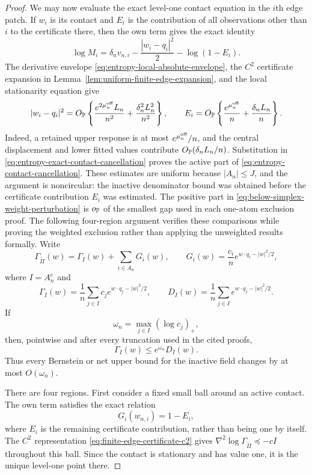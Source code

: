 \begin{proof}
We may now evaluate the exact level-one contact equation in the \(i\)th
edge patch.  If \(w_i\) is its contact and \(E_i\) is the contribution of
all observations other than \(i\) to the certificate there, then the own
term gives the exact identity
\begin{equation}
\label{eq:entropy-exact-contact-cancellation}
 \log M_i
 =
 \delta_nv_{n,i}-\frac{|w_i-q_i|^2}{2}-\log(1-E_i).
\end{equation}
The derivative envelope
\eqref{eq:entropy-local-absolute-envelope}, the \(C^2\) certificate
expansion in Lemma~\ref{lem:uniform-finite-edge-expansion}, and the local
stationarity equation give
\[
 |w_i-q_i|^2
 =O_{\mathbb P}\left\{
  \frac{e^{2\mu_n^{\rm off}}L_n}{n^2}
  +\frac{\delta_n^2L_n^2}{n^2}
 \right\},
 \qquad
 E_i
 =O_{\mathbb P}\left\{
  \frac{e^{\mu_n^{\rm off}}}n+\frac{\delta_nL_n}{n}
 \right\}.
\]
Indeed, a retained upper response is at most
\(e^{\mu_n^{\rm off}}/n\), and the
central displacement and lower fitted values contribute
\(O_{\mathbb P}(\delta_nL_n/n)\).  Substitution in
\eqref{eq:entropy-exact-contact-cancellation} proves the active part of
\eqref{eq:entropy-contact-cancellation}.  These estimates are uniform
because \(|A_n|\le J\), and the argument is noncircular: the inactive
denominator bound was obtained before the certificate contribution
\(E_i\) was estimated.
The positive part in
\eqref{eq:below-simplex-weight-perturbation} is \(o_{\mathbb P}\) of the
smallest gap used in each one-atom exclusion proof.  The following
four-region argument verifies these comparisons while proving the
weighted exclusion rather than applying the unweighted results formally.
Write
\[
 \Gamma_{\widetilde\Pi}(w)
 =
 \Gamma_I(w)+\sum_{i\in A_n}G_i(w),
 \qquad
 G_i(w)=\frac{c_i}{n}e^{w\cdot q_i-|w|^2/2},
\]
where \(I=A_n^c\) and
\[
 \Gamma_I(w)
 =\frac1n\sum_{j\in I}c_j
   e^{w\cdot q_j-|w|^2/2},
 \qquad
 D_I(w)
 =\frac1n\sum_{j\in I}
   e^{w\cdot q_j-|w|^2/2}.
\]
If
\[
 \omega_n
 =\max_{j\in I}(\log c_j)_+,
\]
then, pointwise and after every truncation used in the cited proofs,
\begin{equation}
\label{eq:weighted-inactive-domination}
 \Gamma_I(w)\le e^{\omega_n}D_I(w).
\end{equation}
Thus every Bernstein or net upper bound for the inactive field changes by
at most \(O(\omega_n)\).

There are four regions.  First consider a fixed small ball around an active
contact.  The own term satisfies the exact relation
\[
 G_i(w_{n,i})=1-E_i,
\]
where \(E_i\) is the remaining certificate contribution, rather than
being one by itself.  The \(C^2\) representation
\eqref{eq:finite-edge-certificate-c2} gives
\(\nabla^2\log\Gamma_{\widetilde\Pi}\preceq-cI\) throughout this ball.
Since the contact is stationary and has value one, it is the unique
level-one point there.


\end{proof}
